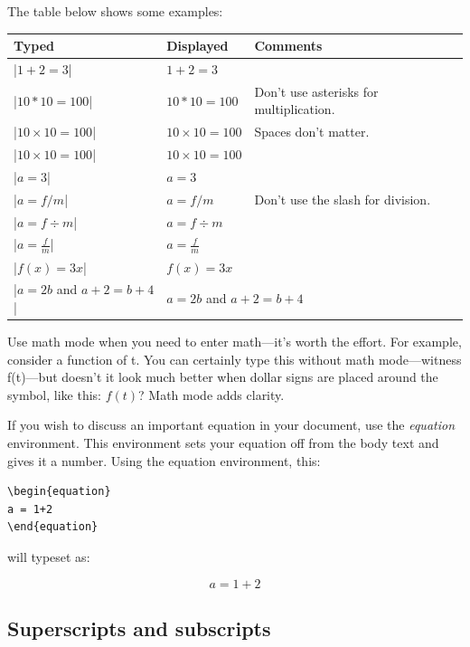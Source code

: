 The table below shows some examples:

\begin{center}
\begin{tabular}{l|l|l}
Typed                   & Displayed & Comments \\\hline
|$1+2=3$|               & $1+2=3$ \\
|$10 * 10 = 100$|       & $10 * 10 = 100$  & {\small Don't use asterisks for multiplication.}\\
|$10\times10=100$|      & $10\times10=100$ & {\small Spaces don't matter.}\\
|$10  \times  10  =  100$|      & $10  \times  10  =  100$\\
|$a=3$|                 & $a=3$\\
|$a=f/m$|               & $a=f/m$ & {\small Don't use the slash for division.}\\
|$a=f \div m$|          & $a=f \div m$\\
|$a=\frac{f}{m}$|       & $a=\frac{f}{m}$\\
|$f(x)=3x$|             & $f(x)=3x$\\
|$a=2b$ and $a+2=b+4$|  & \multicolumn{2}{l}{$a=2b$ and $a+2=b+4$}\\
\end{tabular}
\end{center}

Use math mode when you need to enter math---it's worth the effort. For example,
consider a function of t. You can certainly type this without math
mode---witness f(t)---but doesn't it look much better when dollar signs are
placed around the symbol, like this: $f(t)$? Math mode adds clarity.

If you wish to discuss an important equation in your document, use the
\emph{equation} environment.  This environment sets your equation off from the
body text and gives it a number.
Using the equation environment, this:

\begin{Verbatim}
\begin{equation}
a = 1+2
\end{equation}
\end{Verbatim}

will typeset as:

\begin{equation}
a = 1+2
\end{equation}



\subsection{Superscripts and subscripts}

